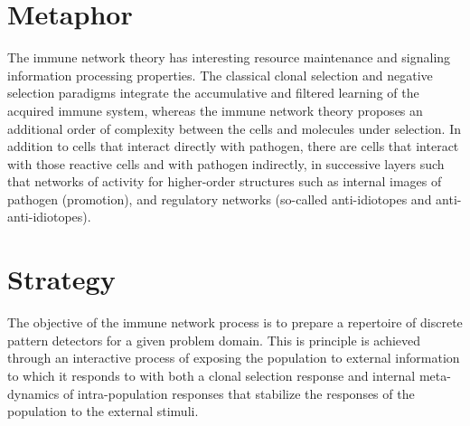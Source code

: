 \documentclass[a4paper, 11pt]{article}
\begin{document}
\section{Metaphor}
\label{sec:metaphor}
The immune network theory has interesting resource maintenance and signaling information processing properties.
The classical clonal selection and negative selection paradigms integrate the accumulative and filtered learning of the acquired immune system, whereas the immune network theory proposes an additional order of complexity between the cells and molecules under selection. In addition to cells that interact directly with pathogen, there are cells that interact with those reactive cells and with pathogen indirectly, in successive layers such that networks of activity for higher-order structures such as internal images of pathogen (promotion), and regulatory networks (so-called anti-idiotopes and anti-anti-idiotopes).

\section{Strategy}
\label{sec:strategy}
The objective of the immune network process is to prepare a repertoire of discrete pattern detectors for a given problem domain.
This is principle is achieved through an interactive process of exposing the population to external information to which it responds to with both a clonal selection response and internal meta-dynamics of intra-population responses that stabilize the responses of the population to the external stimuli.

\end{document}
